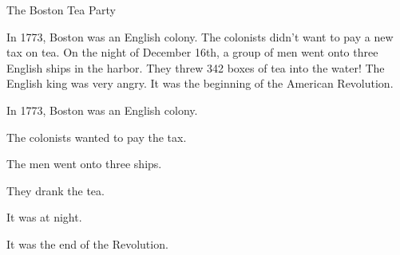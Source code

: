\begin{anglais}
\begin{tcolorbox}[otBase,colback=white,colframe=otRule,boxrule=0.5pt,fontupper=\fontsize{10.8}{14.4}\selectfont]
{\otSemi\fontsize{11}{13}\selectfont The Boston Tea Party}\par\vspace{1.4mm}
In 1773, Boston was an English colony. The colonists didn't want to pay a new tax on tea. On the night
of December 16th, a group of men went onto three English ships in the harbor. They threw 342 boxes of
tea into the water! The English king was very angry. It was the beginning of the American Revolution.
\par{}
\end{tcolorbox}
\begin{questions}[2]
\item In 1773, Boston was an English colony. \hfill{}
\item The colonists wanted to pay the tax. \hfill{}
\item The men went onto three ships. \hfill{}
\item They drank the tea. \hfill{}
\item It was at night. \hfill{}
\item It was the end of the Revolution. \hfill{}
\end{questions}
\end{anglais}


